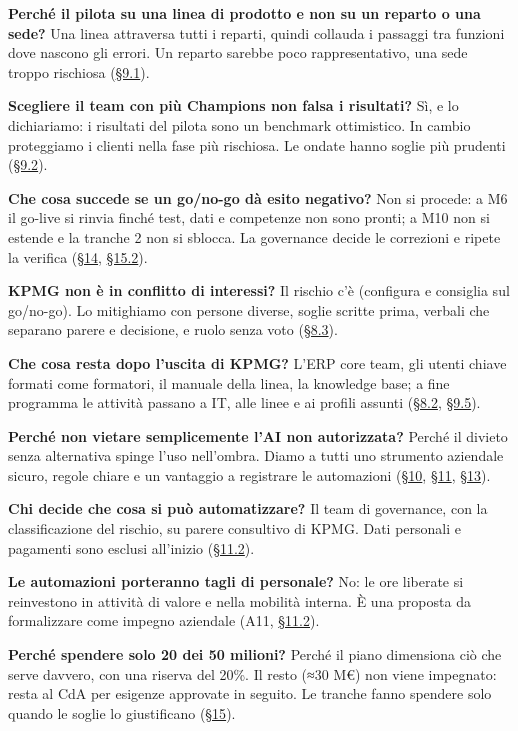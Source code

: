 \documentclass[11pt,a4paper]{article}
\begin{document}
\textbf{Perché il pilota su una linea di prodotto e non su un reparto o una sede?}
Una linea attraversa tutti i reparti, quindi collauda i passaggi tra funzioni dove nascono gli errori. Un reparto sarebbe poco rappresentativo, una sede troppo rischiosa (\hyperref[sec:9.1]{\S9.1}).

\textbf{Scegliere il team con più Champions non falsa i risultati?}
Sì, e lo dichiariamo: i risultati del pilota sono un benchmark ottimistico. In cambio proteggiamo i clienti nella fase più rischiosa. Le ondate hanno soglie più prudenti (\hyperref[sec:9.2]{\S9.2}).

\textbf{Che cosa succede se un go/no-go dà esito negativo?}
Non si procede: a M6 il go-live si rinvia finché test, dati e competenze non sono pronti; a M10 non si estende e la tranche 2 non si sblocca. La governance decide le correzioni e ripete la verifica (\hyperref[sec:14]{\S14}, \hyperref[sec:15.2]{\S15.2}).

\textbf{KPMG non è in conflitto di interessi?}
Il rischio c'è (configura e consiglia sul go/no-go). Lo mitighiamo con persone diverse, soglie scritte prima, verbali che separano parere e decisione, e ruolo senza voto (\hyperref[sec:8.3]{\S8.3}).

\textbf{Che cosa resta dopo l'uscita di KPMG?}
L'ERP core team, gli utenti chiave formati come formatori, il manuale della linea, la knowledge base; a fine programma le attività passano a IT, alle linee e ai profili assunti (\hyperref[sec:8.2]{\S8.2}, \hyperref[sec:9.5]{\S9.5}).

\textbf{Perché non vietare semplicemente l'AI non autorizzata?}
Perché il divieto senza alternativa spinge l'uso nell'ombra. Diamo a tutti uno strumento aziendale sicuro, regole chiare e un vantaggio a registrare le automazioni (\hyperref[sec:10]{\S10}, \hyperref[sec:11]{\S11}, \hyperref[sec:13]{\S13}).

\textbf{Chi decide che cosa si può automatizzare?}
Il team di governance, con la classificazione del rischio, su parere consultivo di KPMG. Dati personali e pagamenti sono esclusi all'inizio (\hyperref[sec:11.2]{\S11.2}).

\textbf{Le automazioni porteranno tagli di personale?}
No: le ore liberate si reinvestono in attività di valore e nella mobilità interna. È una proposta da formalizzare come impegno aziendale (A11, \hyperref[sec:11.2]{\S11.2}).

\textbf{Perché spendere solo 20 dei 50 milioni?}
Perché il piano dimensiona ciò che serve davvero, con una riserva del 20\%. Il resto (≈30 M€) non viene impegnato: resta al CdA per esigenze approvate in seguito. Le tranche fanno spendere solo quando le soglie lo giustificano (\hyperref[sec:15]{\S15}).
\end{document}
